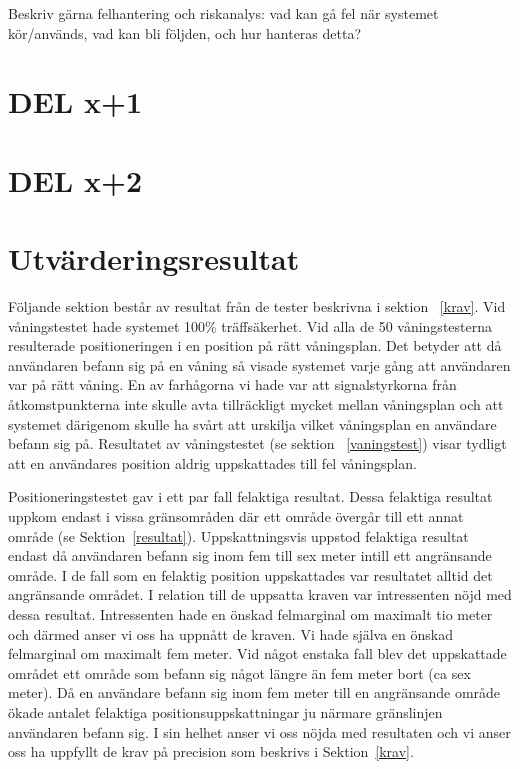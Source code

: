 \documentclass[a4paper,12pt]{article}
\begin{document}
 Beskriv gärna felhantering och riskanalys: vad kan gå fel när systemet kör/används, vad kan bli följden, och hur hanteras detta?

 \section{DEL x+1}
 \section{DEL x+2}

 \fi

 \section{Utvärderingsresultat}\label{utvarderingsresultat}

 Följande sektion består av resultat från de tester beskrivna i sektion ~\ref{krav}.
 Vid våningstestet hade systemet 100\% träffsäkerhet. Vid alla de 50 våningstesterna resulterade positioneringen i en position på rätt våningsplan. Det betyder att då användaren befann sig på en våning så visade systemet varje gång att användaren var på rätt våning. En av farhågorna vi hade var att signalstyrkorna från åtkomstpunkterna inte skulle avta tillräckligt mycket mellan våningsplan och att systemet därigenom skulle ha svårt att urskilja vilket våningsplan en användare befann sig på. Resultatet av våningstestet (se sektion ~\ref{vaningstest}) visar tydligt att en användares position aldrig uppskattades till fel våningsplan.

 Positioneringstestet gav i ett par fall felaktiga resultat. Dessa felaktiga resultat uppkom endast i vissa gränsområden där ett område övergår till ett annat område (se Sektion~\ref{resultat}). Uppskattningsvis uppstod felaktiga resultat endast då användaren befann sig inom fem till sex meter intill ett angränsande område. I de fall som en felaktig position uppskattades var resultatet alltid det angränsande området. I relation till de uppsatta kraven var intressenten nöjd med dessa resultat. Intressenten hade en önskad felmarginal om maximalt tio meter och därmed anser vi oss ha uppnått de kraven. Vi hade själva en önskad felmarginal om maximalt fem meter. Vid något enstaka fall blev det uppskattade området ett område som befann sig något längre än fem meter bort (ca sex meter). Då en användare befann sig inom fem meter till en angränsande område ökade antalet felaktiga positionsuppskattningar ju närmare gränslinjen användaren befann sig. I sin helhet anser vi oss nöjda med resultaten och vi anser oss ha uppfyllt de krav på precision som beskrivs i Sektion~\ref{krav}.
\end{document}
